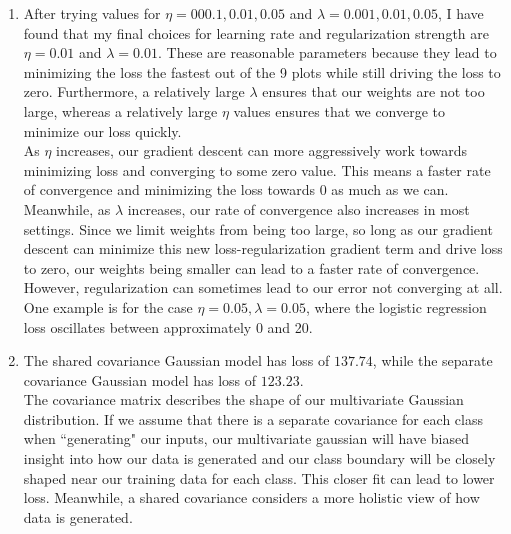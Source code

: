 \documentclass[submit]{harvardml}
\begin{document}
\begin{enumerate}
\begin{figure} [h!]
    \end{figure}
    \newpage
    \item 
    After trying values for $\eta = 000.1, 0.01, 0.05$ and $\lambda = 0.001, 0.01, 0.05$, I have found that my final choices for learning rate and regularization strength are $\eta = 0.01$ and $\lambda = 0.01$. These are reasonable parameters because they lead to minimizing the loss the fastest out of the 9 plots while still driving the loss to zero. Furthermore, a relatively large $\lambda$ ensures that our weights are not too large, whereas a relatively large $\eta$ values ensures that we converge to minimize our loss quickly. \\


    As $\eta$ increases, our gradient descent can more aggressively work towards minimizing loss and converging to some zero value. This means a faster rate of convergence and minimizing the loss towards $0$ as much as we can. \\
    Meanwhile, as $\lambda$ increases, our rate of convergence also increases in most settings. Since we limit weights from being too large, so long as our gradient descent can minimize this new loss-regularization gradient term and drive loss to zero, our weights being smaller can lead to a faster rate of convergence. However, regularization can sometimes lead to our error not converging at all. One example is for the case $\eta = 0.05, \lambda = 0.05$, where the logistic regression loss oscillates between approximately 0 and 20. 
    
    \item The shared covariance Gaussian model has loss of $137.74$, while the separate covariance Gaussian model has loss of $123.23$. \\
    The covariance matrix describes the shape of our multivariate Gaussian distribution. If we assume that there is a separate covariance for each class when ``generating" our inputs, our multivariate gaussian will have biased insight into how our data is generated and our class boundary will be closely shaped near our training data for each class. This closer fit can lead to lower loss. Meanwhile, a shared covariance considers a more holistic view of how data is generated.
    

\end{enumerate}
\end{document}
